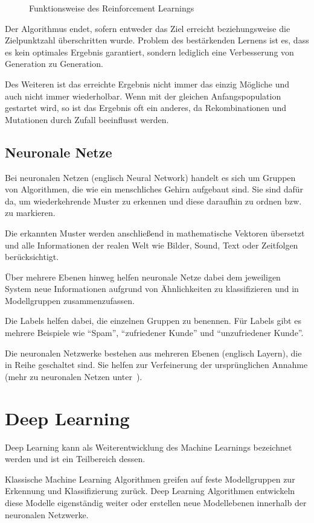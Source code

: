 \begin{figure}[h]
    \caption{Funktionsweise des Reinforcement Learnings}
    \label{fig:grundlagen_reinforcement_learning}
\end{figure}

Der Algorithmus endet, sofern entweder das Ziel erreicht beziehungsweise die Zielpunktzahl überschritten wurde. Problem
des bestärkenden Lernens ist es, dass es kein optimales Ergebnis garantiert, sondern lediglich eine Verbesserung von
Generation zu Generation.

Des Weiteren ist das erreichte Ergebnis nicht immer das einzig Mögliche und auch nicht immer wiederholbar. Wenn mit der
gleichen Anfangspopulation gestartet wird, so ist das Ergebnis oft ein anderes, da Rekombinationen und Mutationen durch
Zufall beeinflusst werden.

\subsection{Neuronale Netze}
Bei neuronalen Netzen (englisch Neural Network) handelt es sich um Gruppen von Algorithmen, die wie ein menschliches
Gehirn aufgebaut sind. Sie sind dafür da, um wiederkehrende Muster zu erkennen und diese daraufhin zu ordnen bzw. zu
markieren.

Die erkannten Muster werden anschließend in mathematische Vektoren übersetzt und alle Informationen der realen Welt wie
Bilder, Sound, Text oder Zeitfolgen berücksichtigt.

Über mehrere Ebenen hinweg helfen neuronale Netze dabei dem jeweiligen System neue Informationen aufgrund von
Ähnlichkeiten zu klassifizieren und in Modellgruppen zusammenzufassen.

Die Labels helfen dabei, die einzelnen Gruppen zu benennen. Für Labels gibt es mehrere Beispiele wie \enquote{Spam},
\enquote{zufriedener Kunde} und \enquote{unzufriedener Kunde}.

Die neuronalen Netzwerke bestehen aus mehreren Ebenen (englisch Layern), die in Reihe geschaltet sind. Sie helfen zur
Verfeinerung der ursprünglichen Annahme (mehr zu neuronalen Netzen unter~\cite{book_grundlagen_neuronalenetze}).

\section{Deep Learning}
Deep Learning kann als Weiterentwicklung des Machine Learnings bezeichnet werden und ist ein Teilbereich dessen.

Klassische Machine Learning Algorithmen greifen auf feste Modellgruppen zur Erkennung und Klassifizierung zurück. Deep
Learning Algorithmen entwickeln diese Modelle eigenständig weiter oder erstellen neue Modellebenen innerhalb der
neuronalen Netzwerke.

